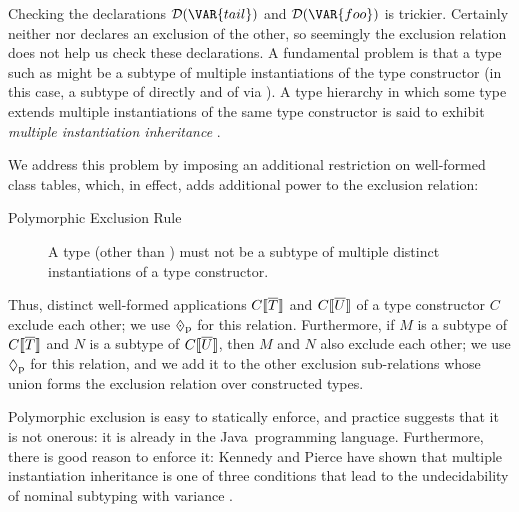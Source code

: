 Checking the declarations $\D(\VAR{tail})$ and $\D(\VAR{foo})$ is trickier.
Certainly neither  nor  declares an exclusion of the other,
so seemingly the exclusion relation does not help us check these declarations.
A fundamental problem is that a type such as  might be a subtype
of multiple instantiations of the type constructor  (in this case,
a subtype of  directly and of  via ).
A type hierarchy in which
some type extends multiple instantiations of the same type constructor is said
to exhibit \emph{multiple instantiation inheritance} \cite{kennedy07}.

We address this problem by imposing an additional restriction on well-formed class tables,
which, in effect, adds additional power to the exclusion relation:
\begin{description}
\item[Polymorphic Exclusion Rule] 
A type (other than \BottomType) 
must not be a subtype of multiple distinct instantiations of a type constructor. 
\end{description}
Thus,
distinct well-formed applications $C\llbracket \overline{T} \rrbracket$ and $C\llbracket \overline{U} \rrbracket$ 
of a type constructor $C$ exclude each other; 
we use $\bexcp$ for this relation.
Furthermore, 
if $M$ is a subtype of $C\llbracket \overline{T} \rrbracket$ 
and $N$ is a subtype of $C\llbracket \overline{U} \rrbracket$, 
then $M$ and $N$ also exclude each other;
we use $\mathrel{\lozenge}_\textrm{p}$ for this relation, 
and we add it to the other exclusion sub-relations 
whose union forms the exclusion relation over constructed types.

Polymorphic exclusion is easy to statically enforce, 
and practice suggests that it is not onerous: 
it is already in the Java\texttrademark\ programming language.
Furthermore, there is good reason to enforce it:
Kennedy and Pierce have shown that multiple instantiation inheritance
is one of three conditions that lead to the undecidability of
nominal subtyping with variance \cite{kennedy07}.

